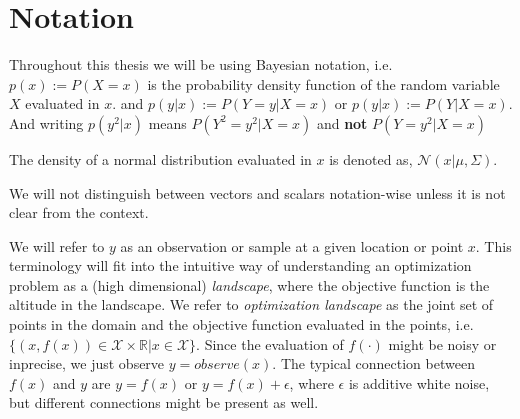 

\section{Notation}
Throughout this thesis we will be using Bayesian notation, i.e. $p(x) := P(X=x)$ is the probability
density function of the random variable $X$ evaluated in $x$. and $p(y|x) := P(Y=y|X=x)$ or $p(y|x)
:= P(Y|X=x)$. And writing $p(y^2|x)$ means $P(Y^2=y^2|X=x)$ and \textbf{not} $P(Y=y^2|X=x)$

The density of a normal distribution evaluated in $x$ is denoted as, $\mathcal{N}(x|\mu, \Sigma)$. 

We will not distinguish between vectors and scalars notation-wise unless it is not clear from the 
context. 

We will refer to $y$ as an observation or sample at a given location or point $x$. This terminology will fit into the intuitive
way of understanding an optimization problem as a (high dimensional) \textit{landscape}, 
where the objective function is the altitude in the landscape. 
We refer to \textit{optimization landscape} as the joint set of points in the domain and the objective function
evaluated in the points, i.e. $\{(x,f(x))\in \mathcal{X} \times \mathbb{R}| x \in \mathcal{X}\}$. Since
the evaluation of $f(\cdot)$ might be noisy or inprecise, we just observe $y = observe(x)$. The typical
connection between $f(x)$ and $y$ are $y = f(x)$ or $y = f(x) + \epsilon$, where $\epsilon$ is additive white noise, 
but different connections might be present as well. 
